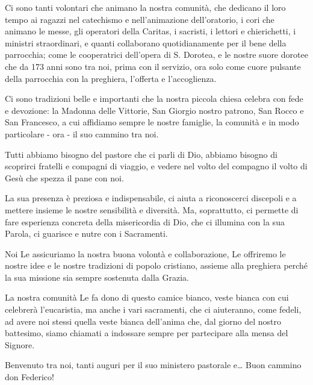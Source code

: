 Ci sono tanti volontari che animano la nostra comunità, che dedicano il loro tempo ai ragazzi nel catechismo e nell'animazione dell'oratorio, i cori che animano le messe, gli operatori della Caritas, i sacristi, i lettori e chierichetti, i ministri straordinari, e quanti collaborano quotidianamente per il bene della parrocchia; come le cooperatrici dell'opera di S. Dorotea, e le nostre suore dorotee che da 173 anni sono tra noi, prima con il servizio, ora solo come cuore pulsante della parrocchia con la preghiera, l'offerta e l'accoglienza.

Ci sono tradizioni belle e importanti che la nostra piccola chiesa celebra con fede e devozione: la Madonna delle Vittorie, San Giorgio nostro patrono, San Rocco e San Francesco, a cui affidiamo sempre le nostre famiglie, la comunità e in modo particolare - ora - il suo cammino tra noi.

Tutti abbiamo bisogno del pastore che ci parli di Dio, abbiamo bisogno di scoprirci fratelli e compagni di viaggio, e vedere nel volto del compagno il volto di Gesù che spezza il pane con noi.

La sua presenza è preziosa e indispensabile, ci aiuta a riconoscerci discepoli e a mettere insieme le nostre sensibilità e diversità. Ma, soprattutto, ci permette di fare esperienza concreta della misericordia di Dio, che ci illumina con la sua Parola, ci guarisce e nutre con i Sacramenti.

Noi Le assicuriamo la nostra buona volontà e collaborazione, Le offriremo le nostre idee e le nostre tradizioni di popolo cristiano, assieme alla preghiera perché la sua missione sia sempre sostenuta dalla Grazia.

La nostra comunità Le fa dono di questo camice bianco, veste bianca con cui celebrerà l'eucaristia, ma anche i vari sacramenti, che ci aiuteranno, come fedeli, ad avere noi stessi quella veste bianca dell'anima che, dal giorno del nostro battesimo, siamo chiamati a indossare sempre per partecipare alla mensa del Signore.

Benvenuto tra noi, tanti auguri per il suo ministero pastorale e\dots
Buon cammino don Federico!

